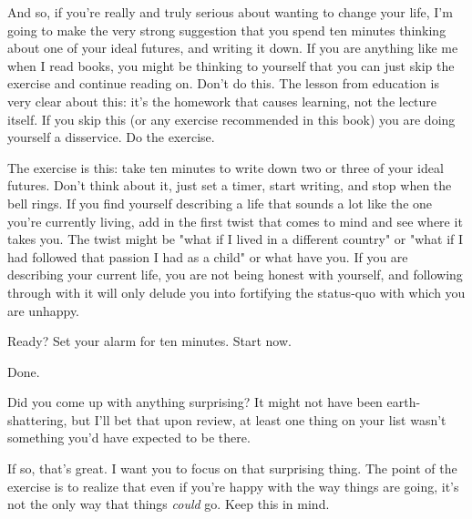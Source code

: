 \documentclass[../the-millions-of-gestures.tex]{subfiles}
\begin{document}
And so, if you're really and truly serious about wanting to change your life,
I'm going to make the very strong suggestion that you spend ten minutes thinking
about one of your ideal futures, and writing it down. If you are anything like
me when I read books, you might be thinking to yourself that you can just skip
the exercise and continue reading on. Don't do this. The lesson from education
is very clear about this: it's the homework that causes learning, not the
lecture itself. If you skip this (or any exercise recommended in this book) you
are doing yourself a disservice. Do the exercise.

The exercise is this: take ten minutes to write down two or three of your ideal
futures. Don't think about it, just set a timer, start writing, and stop when
the bell rings. If you find yourself describing a life that sounds a lot like
the one you're currently living, add in the first twist that comes to mind and
see where it takes you. The twist might be "what if I lived in a different
country" or "what if I had followed that passion I had as a child" or what have
you. If you are describing your current life, you are not being honest with
yourself, and following through with it will only delude you into fortifying the
status-quo with which you are unhappy.

Ready? Set your alarm for ten minutes. Start now.

Done.

Did you come up with anything surprising? It might not have been
earth-shattering, but I'll bet that upon review, at least one thing on your list
wasn't something you'd have expected to be there.

If so, that's great. I want you to focus on that surprising thing. The point of
the exercise is to realize that even if you're happy with the way things are
going, it's not the only way that things \emph{could} go. Keep this in mind.
\end{document}
